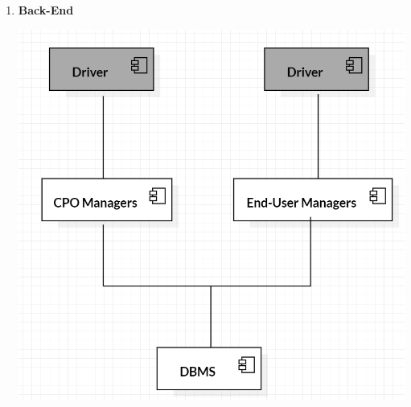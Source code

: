 \documentclass[a4paper]{report}
\begin{document}
\begin{enumerate}
    \item \textbf{Back-End}\par
    \begin{minipage}{\linewidth}
        \centering
        \includegraphics[scale=0.5]{img/INTEGRATION_2.png}
    \end{minipage}\newline\newline
    

\end{enumerate}
\end{document}

